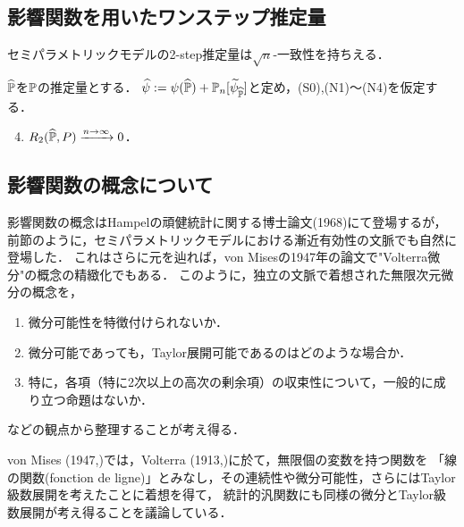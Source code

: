\documentclass[uplatex, dvipdfmx]{jsarticle}
\begin{document}
\subsection{影響関数を用いたワンステップ推定量}

セミパラメトリックモデルの2-step推定量は$\sqrt{n}$-一致性を持ちえる．

\begin{theorem}\label{thm-semiparametric-one-step}
    $\widehat{\mathbb{P}}$を$\mathbb{P}$の推定量とする．
    $\widehat{\psi}:=\psi(\widehat{\mathbb{P}})+\mathbb{P}_n[\widetilde{\psi}_{\widehat{\mathbb{P}}}]$と定め，(S0),(N1)〜(N4)を仮定する．
    \begin{enumerate}[({N}1)]\setcounter{enumi}{3}
        \item $R_2(\widehat{\mathbb{P}},P)\xrightarrow{n\to\infty}0$．
    \end{enumerate}
\end{theorem}

\subsection{影響関数の概念について}

\begin{tcolorbox}[colframe=ForestGreen, colback=ForestGreen!10!white,breakable,colbacktitle=ForestGreen!40!white,coltitle=black,fonttitle=\bfseries\sffamily,
title=]
    影響関数の概念はHampelの頑健統計に関する博士論文(1968)\cite{Hampel68}にて登場するが，
    前節のように，セミパラメトリックモデルにおける漸近有効性の文脈でも自然に登場した．
    これはさらに元を辿れば，von Misesの1947年の論文で"Volterra微分"の概念の精緻化でもある．
    このように，独立の文脈で着想された無限次元微分の概念を，
    \begin{enumerate}
        \item 微分可能性を特徴付けられないか．
        \item 微分可能であっても，Taylor展開可能であるのはどのような場合か．
        \item 特に，各項（特に2次以上の高次の剰余項）の収束性について，一般的に成り立つ命題はないか．
    \end{enumerate}
    などの観点から整理することが考え得る．
\end{tcolorbox}

\begin{history}
    von Mises (1947,\cite{von Mises})では，Volterra (1913,\cite{Vito Volterra})に於て，無限個の変数を持つ関数を
    「線の関数(fonction de ligne)」とみなし，その連続性や微分可能性，さらにはTaylor級数展開を考えたことに着想を得て，
    統計的汎関数にも同様の微分とTaylor級数展開が考え得ることを議論している．
\end{history}
\end{document}
